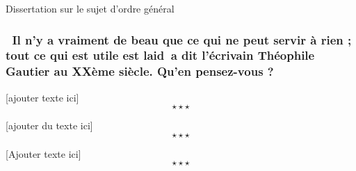 \newpage \begin{bclogo}[barre=none,logo={}]{
		Dissertation sur le sujet d'ordre général
	}
	\begin{center}
		\subsubsection*{\guillemetleft\ Il n'y a vraiment de beau que ce qui ne peut servir à rien ; tout ce qui est utile est laid\guillemetright\ a dit l'écrivain Théophile Gautier au XXème siècle. Qu'en pensez-vous ?}
		
	\end{center}
\end{bclogo}

[ajouter texte ici] $$\star \star \star$$

[ajouter du texte ici]$$\star \star \star$$

[Ajouter texte ici] $$\star \star \star$$
